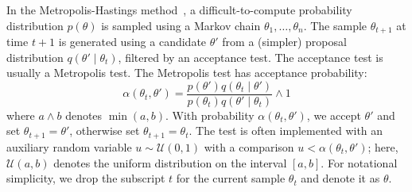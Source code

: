 \documentclass[twoside]{article} \usepackage{aistats2017}
\begin{document}
In the Metropolis-Hastings method~\citep{gilks1996markov,brooks2011handbook}, a
difficult-to-compute probability distribution $p(\theta)$ is sampled using a
Markov chain $\theta_1,\ldots,\theta_n$. The sample $\theta_{t+1}$ at time $t+1$
is generated using a candidate $\theta'$ from a (simpler) proposal distribution
$q(\theta'\mid \theta_t)$, filtered by an acceptance test. The acceptance test
is usually a Metropolis test. The Metropolis test has acceptance probability:
\begin{equation}\label{eq:traditional}
    \alpha(\theta_t,\theta') = \frac{p(\theta')q(\theta_t \mid \theta')}{p(\theta_t)q(\theta' \mid \theta_t)} \wedge 1
\end{equation}
where $a \wedge b$ denotes $\min(a,b)$.  With probability
$\alpha(\theta_t,\theta')$, we accept $\theta'$ and set $\theta_{t+1} =
\theta'$, otherwise set $\theta_{t+1}=\theta_t$.  The test is often implemented
with an auxiliary random variable $u \sim \mathcal{U}(0,1)$ with a comparison
$u<\alpha(\theta_t,\theta')$; here, $\mathcal{U}(a,b)$ denotes the uniform
distribution on the interval $[a,b]$.  For notational simplicity, we drop the
subscript $t$ for the current sample $\theta_t$ and denote it as $\theta$. 
\end{document}

